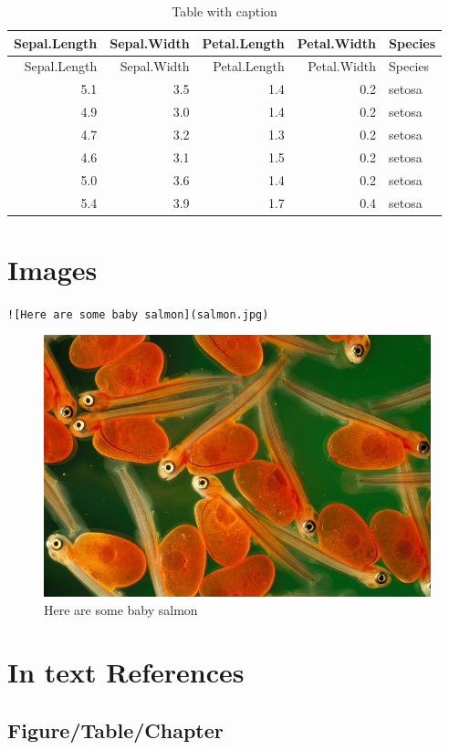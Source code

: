 \documentclass[
]{book}
\begin{document}
\begin{longtable}[]{@{}rrrrl@{}}
\caption{\label{tab:iris-table}Table with caption}\tabularnewline
\toprule
Sepal.Length & Sepal.Width & Petal.Length & Petal.Width & Species\tabularnewline
\midrule
\endfirsthead
\toprule
Sepal.Length & Sepal.Width & Petal.Length & Petal.Width & Species\tabularnewline
\midrule
\endhead
5.1 & 3.5 & 1.4 & 0.2 & setosa\tabularnewline
4.9 & 3.0 & 1.4 & 0.2 & setosa\tabularnewline
4.7 & 3.2 & 1.3 & 0.2 & setosa\tabularnewline
4.6 & 3.1 & 1.5 & 0.2 & setosa\tabularnewline
5.0 & 3.6 & 1.4 & 0.2 & setosa\tabularnewline
5.4 & 3.9 & 1.7 & 0.4 & setosa\tabularnewline
\bottomrule
\end{longtable}

\hypertarget{images}{%
\section{Images}\label{images}}

\texttt{!{[}Here\ are\ some\ baby\ salmon{]}(salmon.jpg)}

\begin{figure}
\centering
\includegraphics{salmon.jpg}
\caption{Here are some baby salmon}
\end{figure}

\hypertarget{in-text-references}{%
\section{In text References}\label{in-text-references}}

\hypertarget{figuretablechapter}{%
\subsection{Figure/Table/Chapter}\label{figuretablechapter}}
\end{document}

